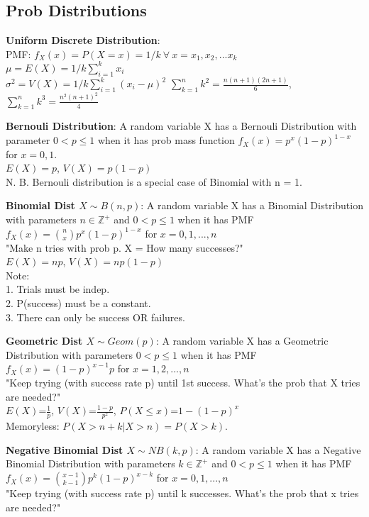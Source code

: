 \documentclass[a4paper,landscape]{article}
\newcommand{\rntopic}[1]{\vspace{-2.0em}\subsection*{#1}\vspace{-1.0em}}
\newcommand{\rnname}[1]{\textbf{#1}}
\newcommand{\ints}{\mathbb{Z}}
\begin{document}
\begin{multicols*}{4}
\begin{flatitemize}
\rntopic{Prob Distributions}
\item \rnname{Uniform Discrete Distribution}: \\ PMF: $f_X(x) = P(X = x) = 1/k\ \forall\ x = x_1, x_2, ... x_k$\\
$\mu = E(X) = 1/k \sum_{i=1}^{k}x_i$ \\
$\sigma^2 = V(X) = 1/k \sum_{i=1}^{k}(x_i - \mu)^2$
$\sum_{k=1}^{n}k^2 = \frac{n(n+1)(2n+1)}{6}$, $\sum_{k=1}^{n}k^3 = \frac{n^2(n+1)^2}{4}$
\item \rnname{Bernouli Distribution}: A random variable X has a Bernouli Distribution with parameter $0 < p \leq 1$ when it has prob mass function $f_X(x) = p^x(1-p)^{1-x}$ for $x = 0, 1$.\\
$E(X) = p$, $V(X) = p(1-p)$\\
N. B. Bernouli distribution is a special case of Binomial with n = 1.
\item \rnname{Binomial Dist $X \sim B(n,p)$}: A random variable X has a Binomial Distribution with parameters $n \in \ints^+$ and $0 < p \leq 1$ when it has PMF
$f_X(x) = {n \choose x} p^x(1-p)^{1-x}$ for $x = 0, 1, ..., n$\\
"Make n tries with prob p. X = How many successes?" \\
$E(X) = np$, $V(X) = np(1-p)$ \\
Note: \\
1. Trials must be indep. \\
2. P(success) must be a constant. \\
3. There can only be success OR failures.
\item \rnname{Geometric Dist $X \sim Geom(p)$}: A random variable X has a Geometric Distribution with parameters $0 < p \leq 1$ when it has PMF
$f_X(x) = (1-p)^{x-1}p$ for $x = 1, 2, ..., n$\\
"Keep trying (with success rate p) until 1st success. What's the prob that X tries are needed?" \\
$E(X)$=$\frac{1}{p}$, $V(X)$=$\frac{1-p}{p^2}$, $P(X \leq x)$=$1 - (1 - p)^x$ \\
Memoryless: $P(X > n+k | X > n) = P(X > k)$.
\item \rnname{Negative Binomial Dist $X \sim NB(k, p)$}: A random variable X has a Negative Binomial Distribution with parameters $k \in \ints^+$ and $0 < p \leq 1$ when it has PMF
$f_X(x) = {x - 1 \choose k - 1} p^k (1-p)^{x-k}$ for $x = 0, 1, ..., n$\\
"Keep trying (with success rate p) until k successes. What's the prob that x tries are needed?" \\

\end{flatitemize}
\end{multicols*}
\end{document}
